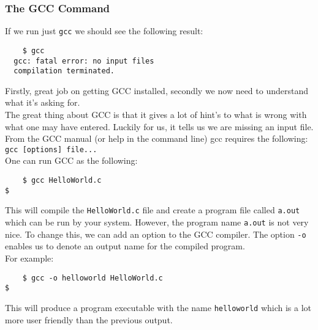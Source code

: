 \subsubsection{The GCC Command}
If we run just \texttt{gcc} we should see the following result:
\begin{commandline}
\begin{verbatim}
	$ gcc
  gcc: fatal error: no input files
  compilation terminated.
\end{verbatim}
\end{commandline}
Firstly, great job on getting GCC installed, secondly we now need to understand what it's asking for.\\
The great thing about GCC is that it gives a lot of hint's to what is wrong with what one may have entered. Luckily for us, it tells us we are missing an input file. From the GCC manual (or help in the command line) gcc requires the following: \texttt{gcc [options] file...}\\
One can run GCC as the following:
\begin{commandline}
\begin{verbatim}
	$ gcc HelloWorld.c
$
\end{verbatim}
\end{commandline}
This will compile the \texttt{HelloWorld.c} file and create a program file called \texttt{a.out} which can be run by your system. However, the program name \texttt{a.out} is not very nice. To change this, we can add an option to the GCC compiler. The option \texttt{-o} enables us to denote an output name for the compiled program.\\
For example:
\begin{commandline}
\begin{verbatim}
	$ gcc -o helloworld HelloWorld.c
$
\end{verbatim}
\end{commandline}
This will produce a program executable with the name \texttt{helloworld} which is a lot more user friendly than the previous output. 
